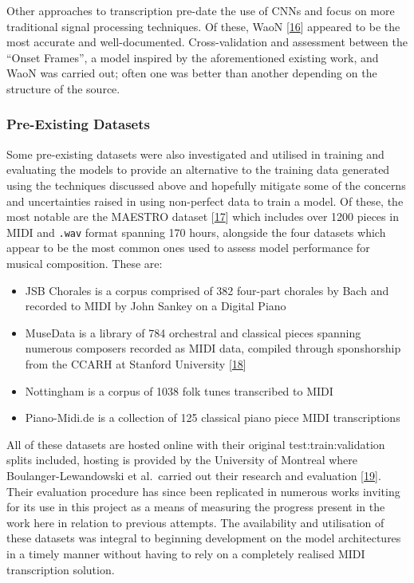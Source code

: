 \documentclass[12pt,]{article}
\providecommand{\tightlist}{%
  \setlength{\itemsep}{0pt}\setlength{\parskip}{0pt}}
\begin{document}
Other approaches to transcription pre-date the use of CNNs and focus on
more traditional signal processing techniques. Of these, WaoN
{[}\protect\hyperlink{ref-waon}{16}{]} appeared to be the most accurate
and well-documented. Cross-validation and assessment between the ``Onset
Frames'', a model inspired by the aforementioned existing work, and WaoN
was carried out; often one was better than another depending on the
structure of the source.

\hypertarget{pre-existing-datasets}{%
\subsubsection{Pre-Existing Datasets}\label{pre-existing-datasets}}

Some pre-existing datasets were also investigated and utilised in
training and evaluating the models to provide an alternative to the
training data generated using the techniques discussed above and
hopefully mitigate some of the concerns and uncertainties raised in
using non-perfect data to train a model. Of these, the most notable are
the MAESTRO dataset {[}\protect\hyperlink{ref-maestro2018}{17}{]} which
includes over 1200 pieces in MIDI and \texttt{.wav} format spanning 170
hours, alongside the four datasets which appear to be the most common
ones used to assess model performance for musical composition. These
are:

\begin{itemize}
\tightlist
\item
  JSB Chorales is a corpus comprised of 382 four-part chorales by Bach
  and recorded to MIDI by John Sankey on a Digital Piano
\item
  MuseData is a library of 784 orchestral and classical pieces spanning
  numerous composers recorded as MIDI data, compiled through
  sponshorship from the CCARH at Stanford University
  {[}\protect\hyperlink{ref-ccarh}{18}{]}
\item
  Nottingham is a corpus of 1038 folk tunes transcribed to MIDI
\item
  Piano-Midi.de is a collection of 125 classical piano piece MIDI
  transcriptions
\end{itemize}

All of these datasets are hosted online with their original
test:train:validation splits included, hosting is provided by the
University of Montreal where Boulanger-Lewandowski et al.~carried out
their research and evaluation
{[}\protect\hyperlink{ref-boulanger2012modeling}{19}{]}. Their
evaluation procedure has since been replicated in numerous works
inviting for its use in this project as a means of measuring the
progress present in the work here in relation to previous attempts. The
availability and utilisation of these datasets was integral to beginning
development on the model architectures in a timely manner without having
to rely on a completely realised MIDI transcription solution.
\end{document}
